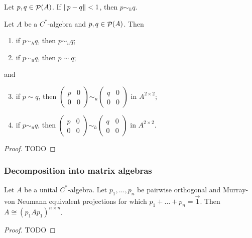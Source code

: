 \begin{proposition}
Let  $p,q\in \mathop{\mathcal{P}}\nolimits(A)$. If $\lVert p-q\rVert< 1$, then $p \sim_h q$.
\end{proposition}

\begin{proposition} \label{prop:implicationsBeweenEquivalences}
Let $A$ be a $C^*$-algebra and $p,q\in\mathop{\mathcal{P}}\nolimits(A)$. Then
\begin{enumerate}
\item if $p\sim_h q$, then $p \sim_u q$;
\item if $p\sim_u q$, then $p \sim q$;
\end{enumerate}and
\begin{enumerate}
\setcounter{enumi}{2}
\item if $p\sim q$, then $\begin{pmatrix}
p & 0 \\ 0 & 0
\end{pmatrix} \sim_u \begin{pmatrix}
q & 0 \\ 0 & 0
\end{pmatrix}$ in $A^{2\times 2}$;
\item if $p\sim_u q$, then $\begin{pmatrix}
p & 0 \\ 0 & 0
\end{pmatrix} \sim_h \begin{pmatrix}
q & 0 \\ 0 & 0
\end{pmatrix}$ in $A^{2\times 2}$.
\end{enumerate}
\end{proposition}
\begin{proof}
TODO
\end{proof}
\subsubsection{Decomposition into matrix algebras}
\begin{proposition}
Let $A$ be a unital $C^*$-algebra. Let $p_1,\ldots ,p_n$ be pairwise orthogonal and Murray-von Neumann equivalent projections for which $p_1 + \ldots + p_n = \vec{1}$. Then $A \cong (p_1Ap_1)^{n\times n}$.
\end{proposition}
\begin{proof}
TODO
\end{proof}

